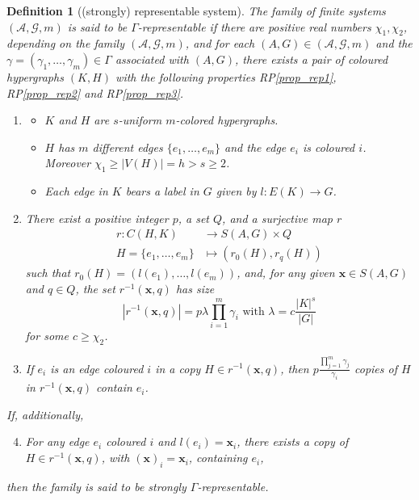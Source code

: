 \documentclass[10pt]{article}
\newtheorem{definition}[theorem]{Definition}
\begin{document}
\begin{definition}[(strongly) representable system] \label{d.rep_sys}
	The family of finite systems $(\mathcal{A},\mathcal{G},m)$ 
	is said to be $\Gamma$-representable if there are positive real numbers $\chi_1, \chi_2$, depending on the family $(\mathcal{A},\mathcal{G},m)$, and for each $(A,G)\in (\mathcal{A},\mathcal{G},m)$ and the $\gamma=(\gamma_1,\ldots,\gamma_m)\in \Gamma$ associated with $(A,G)$, there exists a pair of coloured hypergraphs $(K,H)$ 
	with the following properties RP\ref{prop_rep1}, RP\ref{prop_rep2} and RP\ref{prop_rep3}.
\begin{enumerate}[RP1]
	\item \label{prop_rep1} 
	\begin{itemize}
		\item $K$ and $H$ are $s$-uniform $m$-colored hypergraphs. 
		\item $H$ has $m$ different edges $\{e_1,\ldots,e_m\}$ and the edge $e_i$ is coloured $i$. Moreover  $\chi_1\geq|V(H)|=h>s\geq2$. 
		\item Each edge in $K$ bears a label in $G$ given by $l:E(K)\to G$. 
	\end{itemize}

\item \label{prop_rep2} There exist a positive integer $p$, a set $Q$, and 
a 
surjective map $r$
	\begin{align}
		r:C(H,K) &\longrightarrow  S(A,G)\times Q\nonumber \\
		H=\{e_1,\ldots,e_m\}&\longmapsto (r_0(H),r_q(H)) \nonumber
	\end{align}
	such that $r_0(H)=(l(e_1),\ldots,l(e_m))$, and, for any given $\mathbf{x}\in S(A,G)$ and $q\in Q$, 
the set $r^{-1}(\mathbf{x},q)$ has size 
 		 \begin{displaymath}
 		 	|r^{-1}(\mathbf{x},q)|=p \lambda \prod_{i=1}^m \gamma_i \text{ with } \lambda= c\frac{|K|^s}{|G|} 
 		 \end{displaymath}
 		for some $c\geq \chi_2$.
\item \label{prop_rep3} If $e_i$ is an edge coloured $i$ in a copy $H \in r^{-1}(\mathbf{x},q)$, then $p\frac{\prod_{j=1}^m\gamma_j}{\gamma_i}$ copies of $H$ in $r^{-1}(\mathbf{x},q)$ contain $e_i$.

\end{enumerate}
If, additionally, 
\begin{enumerate}[RP1]
	  \setcounter{enumi}{3}
	\item \label{prop_rep4} For any edge $e_i$ coloured $i$ and $l(e_i)=\mathbf{x}_i$, there exists a copy of $H\in r^{-1}(\mathbf{x},q)$, with $(\mathbf{x})_i=\mathbf{x}_i$, containing $e_i$,
\end{enumerate}
then the family is said to be strongly $\Gamma$-representable.
\end{definition}
\end{document}
